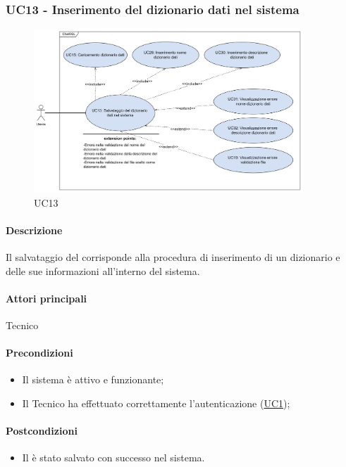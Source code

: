 \subsubsection{UC13 - Inserimento del dizionario dati nel sistema}\label{UC13}

\begin{figure}[H]
  \centering
  \includegraphics[width=0.90\textwidth]{assets/uc13.png}
  \caption{UC13}
\end{figure}

\paragraph*{Descrizione}
Il salvataggio del  corrisponde alla procedura di inserimento di un dizionario e delle sue informazioni all'interno del sistema.

\paragraph*{Attori principali}
Tecnico

\paragraph*{Precondizioni}
\begin{itemize}
  \item Il sistema è attivo e funzionante;
  \item Il Tecnico ha effettuato correttamente l'autenticazione (\hyperref[UC1]{UC1});
\end{itemize}

\paragraph*{Postcondizioni}
\begin{itemize}
  \item Il  è stato salvato con successo nel sistema.
\end{itemize}

